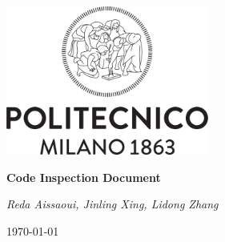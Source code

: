 \begin{titlepage}
\centering
\includegraphics[width=0.50\textwidth]{RASD/resources/logo_polimi.png}\par
\vspace{1.5cm}
{\LARGE \textbf{Code Inspection Document} \par}
\vspace{0.2cm}
{\large {}\par}
\vspace{1.0cm}
{\large\itshape Reda Aissaoui,  Jinling Xing,  Lidong Zhang\par}
\vspace{2cm}
\vfill
{\large \today \par}
\end{titlepage}
